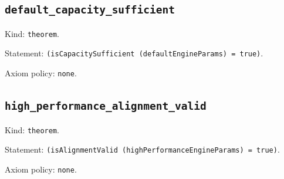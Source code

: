 \documentclass[11pt]{article}
\begin{document}
\subsection*{\texttt{default\_capacity\_sufficient}}
\noindent Kind: \texttt{theorem}.\par
\noindent Statement: \texttt{(isCapacitySufficient (defaultEngineParams) = true)}.\par
\noindent Axiom policy: \texttt{none}.\par
\subsection*{\texttt{high\_performance\_alignment\_valid}}
\noindent Kind: \texttt{theorem}.\par
\noindent Statement: \texttt{(isAlignmentValid (highPerformanceEngineParams) = true)}.\par
\noindent Axiom policy: \texttt{none}.\par
\end{document}
